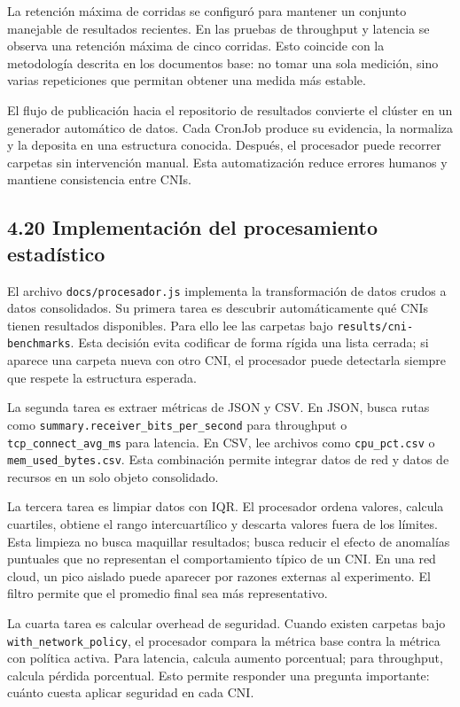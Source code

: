 \documentclass[journal]{IEEEtran}
\begin{document}
La retención máxima de corridas se configuró para mantener un conjunto manejable de resultados recientes. En las pruebas de throughput y latencia se observa una retención máxima de cinco corridas. Esto coincide con la metodología descrita en los documentos base: no tomar una sola medición, sino varias repeticiones que permitan obtener una medida más estable.

El flujo de publicación hacia el repositorio de resultados convierte el clúster en un generador automático de datos. Cada CronJob produce su evidencia, la normaliza y la deposita en una estructura conocida. Después, el procesador puede recorrer carpetas sin intervención manual. Esta automatización reduce errores humanos y mantiene consistencia entre CNIs.

\subsection{4.20 Implementación del procesamiento estadístico}

El archivo \texttt{docs/procesador.js} implementa la transformación de datos crudos a datos consolidados. Su primera tarea es descubrir automáticamente qué CNIs tienen resultados disponibles. Para ello lee las carpetas bajo \texttt{results/cni-benchmarks}. Esta decisión evita codificar de forma rígida una lista cerrada; si aparece una carpeta nueva con otro CNI, el procesador puede detectarla siempre que respete la estructura esperada.

La segunda tarea es extraer métricas de JSON y CSV. En JSON, busca rutas como \texttt{summary.receiver\_bits\_per\_second} para throughput o \texttt{tcp\_connect\_avg\_ms} para latencia. En CSV, lee archivos como \texttt{cpu\_pct.csv} o \texttt{mem\_used\_bytes.csv}. Esta combinación permite integrar datos de red y datos de recursos en un solo objeto consolidado.

La tercera tarea es limpiar datos con IQR. El procesador ordena valores, calcula cuartiles, obtiene el rango intercuartílico y descarta valores fuera de los límites. Esta limpieza no busca maquillar resultados; busca reducir el efecto de anomalías puntuales que no representan el comportamiento típico de un CNI. En una red cloud, un pico aislado puede aparecer por razones externas al experimento. El filtro permite que el promedio final sea más representativo.

La cuarta tarea es calcular overhead de seguridad. Cuando existen carpetas bajo \texttt{with\_network\_policy}, el procesador compara la métrica base contra la métrica con política activa. Para latencia, calcula aumento porcentual; para throughput, calcula pérdida porcentual. Esto permite responder una pregunta importante: cuánto cuesta aplicar seguridad en cada CNI.
\end{document}
